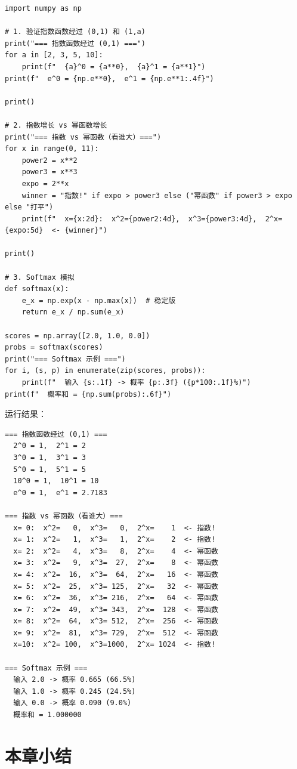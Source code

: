 \begin{lstlisting}[caption=指数函数的数值验证]
import numpy as np

# 1. 验证指数函数经过 (0,1) 和 (1,a)
print("=== 指数函数经过 (0,1) ===")
for a in [2, 3, 5, 10]:
    print(f"  {a}^0 = {a**0},  {a}^1 = {a**1}")
print(f"  e^0 = {np.e**0},  e^1 = {np.e**1:.4f}")

print()

# 2. 指数增长 vs 幂函数增长
print("=== 指数 vs 幂函数（看谁大）===")
for x in range(0, 11):
    power2 = x**2
    power3 = x**3
    expo = 2**x
    winner = "指数!" if expo > power3 else ("幂函数" if power3 > expo else "打平")
    print(f"  x={x:2d}:  x^2={power2:4d},  x^3={power3:4d},  2^x={expo:5d}  <- {winner}")

print()

# 3. Softmax 模拟
def softmax(x):
    e_x = np.exp(x - np.max(x))  # 稳定版
    return e_x / np.sum(e_x)

scores = np.array([2.0, 1.0, 0.0])
probs = softmax(scores)
print("=== Softmax 示例 ===")
for i, (s, p) in enumerate(zip(scores, probs)):
    print(f"  输入 {s:.1f} -> 概率 {p:.3f} ({p*100:.1f}%)")
print(f"  概率和 = {np.sum(probs):.6f}")
\end{lstlisting}

运行结果：
\begin{lstlisting}[frame=none,backgroundcolor={},numbers=none]
=== 指数函数经过 (0,1) ===
  2^0 = 1,  2^1 = 2
  3^0 = 1,  3^1 = 3
  5^0 = 1,  5^1 = 5
  10^0 = 1,  10^1 = 10
  e^0 = 1,  e^1 = 2.7183

=== 指数 vs 幂函数（看谁大）===
  x= 0:  x^2=   0,  x^3=   0,  2^x=    1  <- 指数!
  x= 1:  x^2=   1,  x^3=   1,  2^x=    2  <- 指数!
  x= 2:  x^2=   4,  x^3=   8,  2^x=    4  <- 幂函数
  x= 3:  x^2=   9,  x^3=  27,  2^x=    8  <- 幂函数
  x= 4:  x^2=  16,  x^3=  64,  2^x=   16  <- 幂函数
  x= 5:  x^2=  25,  x^3= 125,  2^x=   32  <- 幂函数
  x= 6:  x^2=  36,  x^3= 216,  2^x=   64  <- 幂函数
  x= 7:  x^2=  49,  x^3= 343,  2^x=  128  <- 幂函数
  x= 8:  x^2=  64,  x^3= 512,  2^x=  256  <- 幂函数
  x= 9:  x^2=  81,  x^3= 729,  2^x=  512  <- 幂函数
  x=10:  x^2= 100,  x^3=1000,  2^x= 1024  <- 指数!

=== Softmax 示例 ===
  输入 2.0 -> 概率 0.665 (66.5%)
  输入 1.0 -> 概率 0.245 (24.5%)
  输入 0.0 -> 概率 0.090 (9.0%)
  概率和 = 1.000000
\end{lstlisting}


\section{本章小结}

